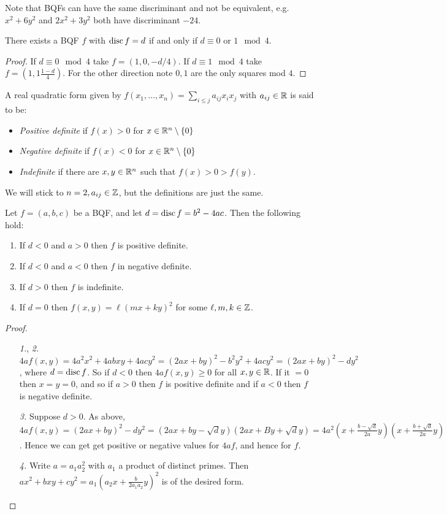 \documentclass[10pt,a4paper]{article}
\begin{document}
Note that BQFs can have the same discriminant and not be equivalent, e.g. $x^2 + 6y^2$ and $2x^2+3y^2$ both have discriminant $-24$.
\begin{lemma}
There exists a BQF $f$ with $\operatorname{disc} f = d$ if and only if $d\equiv 0$ or $1 \mod 4$.
\end{lemma}
\begin{proof}
If $d \equiv 0 \mod 4$ take $f = (1,0,-d/4)$. If $d\equiv 1 \mod 4$ take $f = (1,1 \frac{1-d}{4})$. For the other direction note $0, 1$ are the only squares mod $4$.
\end{proof}

A real quadratic form given by $f(x_1, \ldots, x_n) = \sum_{i\leq j} a_{ij} x_i x_j$ with $a_{ij} \in \mathbb{R}$ is said to be:
\begin{itemize}
\item \emph{Positive definite} if $f(x) > 0$ for $x \in \mathbb{R}^n\setminus\{0\}$
\item \emph{Negative definite} if $f(x) < 0$ for $x \in \mathbb{R}^n\setminus\{0\}$
\item \emph{Indefinite} if there are $x, y \in \mathbb{R}^n$ such that $f(x) > 0 > f(y)$.
\end{itemize}
We will stick to $n = 2, a_{ij}\in \mathbb{Z}$, but the definitions are just the same.
\begin{lemma}
Let $f = (a,b,c)$ be a BQF, and let $d = \operatorname{disc} f = b^2 - 4ac$. Then the following hold:
\begin{enumerate}
\item If $d < 0$ and $a > 0$ then $f$ is positive definite.
\item If $d < 0$ and $a < 0$ then $f$ in negative definite.
\item If $d > 0$ then $f$ is indefinite.
\item If $d = 0$ then $f(x,y) = \ell(mx+ky)^2$ for some $\ell, m, k \in \mathbb{Z}$.
\end{enumerate}
\end{lemma}
\begin{proof}
\item 
\begin{itemize}
\item[\textit{1.}, \textit{2.}] $4af(x,y) = 4a^2x^2 + 4abxy + 4acy^2 = (2ax+by)^2 - b^2y^2 + 4acy^2 = (2ax+by)^2 - dy^2$, where $d = \operatorname{disc} f$. So if $d < 0$ then $4af(x,y) \geq 0$ for all $x,y \in \mathbb{R}$. If it $=0$ then $x=y=0$, and so if $a>0$ then $f$ is positive definite and if $a<0$ then $f$ is negative definite.
\item[\textit{3.}] Suppose $d > 0$. As above, $4af(x,y) = (2ax+by)^2-dy^2 = (2ax+by-\sqrt{d}y)(2ax+By+\sqrt{d}y) = 4a^2(x+\frac{b-\sqrt{d}}{2a}y)(x+\frac{b+\sqrt{d}}{2a}y)$. Hence we can get get positive or negative values for $4af$, and hence for $f$.
\item[\textit{4.}] Write $a = a_1a_2^2$ with $a_1$ a product of distinct primes. Then $ax^2 + bxy+cy^2 = a_1(a_2x + \frac{b}{2a_1a_2}y)^2$ is of the desired form.
\end{itemize}
\end{proof}
\end{document}
